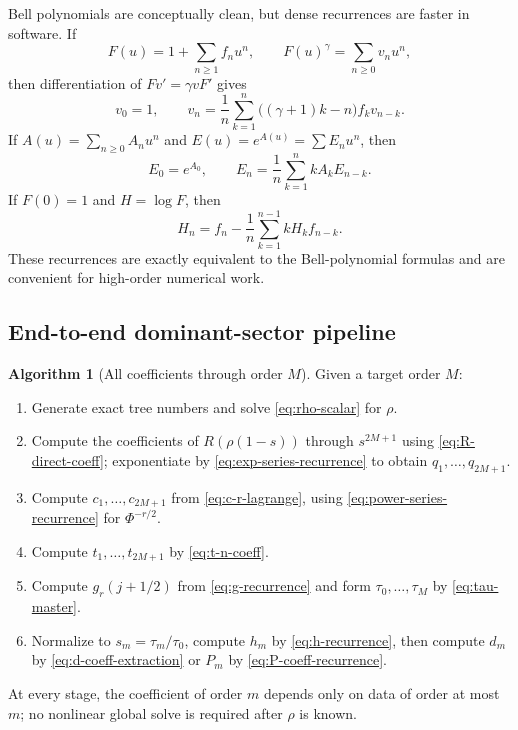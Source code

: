 \documentclass[11pt,oneside]{article}
\numberwithin{equation}{section}
\theoremstyle{plain}
\theoremstyle{definition}
\newtheorem{algorithm}[theorem]{Algorithm}
\theoremstyle{remark}
\begin{document}
Bell polynomials are conceptually clean, but dense recurrences are faster in
software.  If
\[
 F(u)=1+\sum_{n\ge1}f_nu^n,
 \qquad F(u)^\gamma=\sum_{n\ge0}v_nu^n,
\]
then differentiation of $Fv'=\gamma vF'$ gives
\begin{equation}\label{eq:power-series-recurrence}
 v_0=1,\qquad
 v_n=\frac1n\sum_{k=1}^{n}\bigl((\gamma+1)k-n\bigr)f_kv_{n-k}.
\end{equation}
If $A(u)=\sum_{n\ge0}A_nu^n$ and
$E(u)=e^{A(u)}=\sum E_nu^n$, then
\begin{equation}\label{eq:exp-series-recurrence}
 E_0=e^{A_0},\qquad
 E_n=\frac1n\sum_{k=1}^{n}kA_kE_{n-k}.
\end{equation}
If $F(0)=1$ and $H=\log F$, then
\begin{equation}\label{eq:log-series-recurrence-general}
 H_n=f_n-\frac1n\sum_{k=1}^{n-1}kH_kf_{n-k}.
\end{equation}
These recurrences are exactly equivalent to the Bell-polynomial formulas and
are convenient for high-order numerical work.

\subsection{End-to-end dominant-sector pipeline}

\begin{algorithm}[All coefficients through order $M$]\label{alg:dominant-pipeline}
Given a target order $M$:
\begin{enumerate}
\item Generate exact tree numbers and solve \eqref{eq:rho-scalar} for $\rho$.
\item Compute the coefficients of $R(\rho(1-s))$ through $s^{2M+1}$ using
      \eqref{eq:R-direct-coeff}; exponentiate by
      \eqref{eq:exp-series-recurrence} to obtain $q_1,\ldots,q_{2M+1}$.
\item Compute $c_1,\ldots,c_{2M+1}$ from
      \eqref{eq:c-r-lagrange}, using
      \eqref{eq:power-series-recurrence} for $\Phi^{-r/2}$.
\item Compute $t_1,\ldots,t_{2M+1}$ by \eqref{eq:t-n-coeff}.
\item Compute $g_r(j+1/2)$ from \eqref{eq:g-recurrence} and form
      $\tau_0,\ldots,\tau_M$ by \eqref{eq:tau-master}.
\item Normalize to $s_m=\tau_m/\tau_0$, compute $h_m$ by
      \eqref{eq:h-recurrence}, then compute $d_m$ by
      \eqref{eq:d-coeff-extraction} or $P_m$ by
      \eqref{eq:P-coeff-recurrence}.
\end{enumerate}
At every stage, the coefficient of order $m$ depends only on data of order
at most $m$; no nonlinear global solve is required after $\rho$ is known.
\end{algorithm}
\end{document}
